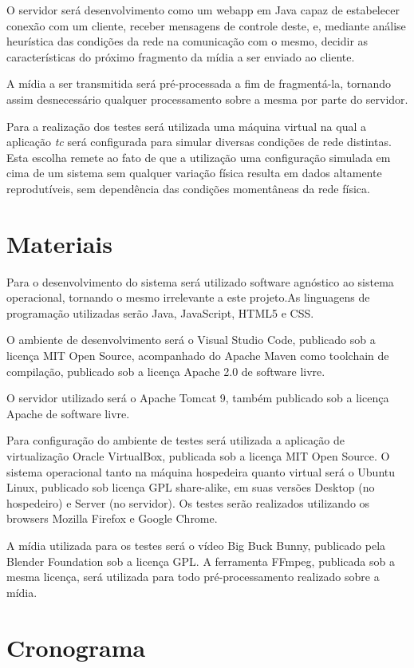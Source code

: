 \documentclass[a4paper,12pt]{article}
\begin{document}
O servidor será desenvolvimento como um webapp em Java capaz de estabelecer conexão com um cliente, receber mensagens de controle deste, e, mediante análise heurística das condições da rede na comunicação com o mesmo, decidir as características do próximo fragmento da mídia a ser enviado ao cliente.

A mídia a ser transmitida será pré-processada a fim de fragmentá-la, tornando assim desnecessário qualquer processamento sobre a mesma por parte do servidor.

Para a realização dos testes será utilizada uma máquina virtual na qual a aplicação \textit{tc} será configurada para simular diversas condições de rede distintas. Esta escolha remete ao fato de que a utilização uma configuração simulada em cima de um sistema sem qualquer variação física resulta em dados altamente reprodutíveis, sem dependência das condições momentâneas da rede física.

\section{Materiais}

Para o desenvolvimento do sistema será utilizado software agnóstico ao sistema operacional, tornando o mesmo irrelevante a este projeto.As linguagens de programação utilizadas serão Java, JavaScript, HTML5 e CSS.

O ambiente de desenvolvimento será o Visual Studio Code, publicado sob a licença MIT Open Source, acompanhado do Apache Maven como toolchain de compilação, publicado sob a licença Apache 2.0 de software livre.

O servidor utilizado será o Apache Tomcat 9, também publicado sob a licença Apache de software livre.

Para configuração do ambiente de testes será utilizada a aplicação de virtualização Oracle VirtualBox, publicada sob a licença MIT Open Source. O sistema operacional tanto na máquina hospedeira quanto virtual será o Ubuntu Linux, publicado sob licença GPL share-alike, em suas versões Desktop (no hospedeiro) e Server (no servidor). Os testes serão realizados utilizando os browsers Mozilla Firefox e Google Chrome.

A mídia utilizada para os testes será o vídeo Big Buck Bunny, publicado pela Blender Foundation sob a licença GPL. A ferramenta FFmpeg, publicada sob a mesma licença, será utilizada para todo pré-processamento realizado sobre a mídia.

\section{Cronograma}
\end{document}
